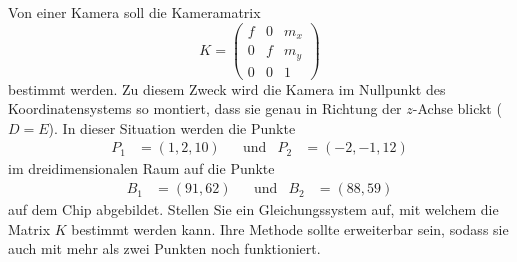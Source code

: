 Von einer Kamera soll die Kameramatrix
\[
K=\begin{pmatrix}
f&0&m_x\\
0&f&m_y\\
0&0&1
\end{pmatrix}
\]
bestimmt werden.
Zu diesem Zweck wird die Kamera im Nullpunkt des Koordinatensystems
so montiert, dass sie genau in Richtung der $z$-Achse blickt ($D=E$).
In dieser Situation werden die Punkte
\[
\begin{aligned}
P_1&=(1,2,10)
&&\text{und}&
P_2&=(-2,-1,12)
\end{aligned}
\]
im dreidimensionalen Raum auf die Punkte
\[
\begin{aligned}
B_1&=(91,62)
&&\text{und}&
B_2&=(88,59)
\end{aligned}
\]
auf dem Chip abgebildet.
Stellen Sie ein Gleichungssystem auf, mit welchem die Matrix $K$ 
bestimmt werden kann.
Ihre Methode sollte erweiterbar sein, sodass sie auch mit mehr als 
zwei Punkten noch funktioniert.

